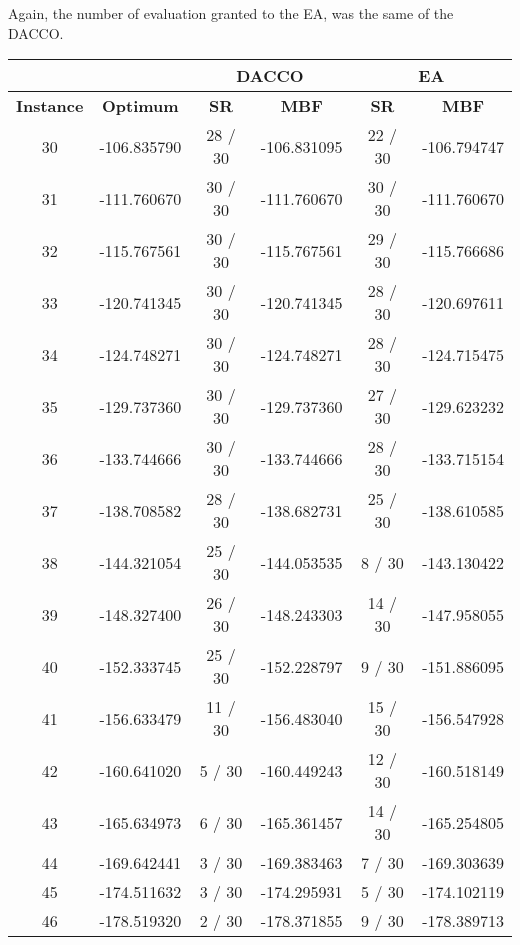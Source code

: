			Again, the number of evaluation granted to the EA, was the same of the DACCO. 

		\begin{table}[!htdp]
				\begin{center}
					\begin{tabular}{| c | c | c | c | c | c |}
						\hline
						\multicolumn{2}{|c|}{} & \multicolumn{2}{c|}{\textbf{DACCO}} & \multicolumn{2}{c|}{\textbf{EA}}\\ \hline
						\textbf{Instance} & \textbf{Optimum} & \textbf{SR} & \textbf{MBF} & \textbf{SR} & \textbf{MBF} \\ \hline
						30 & -106.835790 & 28 / 30 & -106.831095 & 22 / 30 & -106.794747 \\ \hline
						31 & -111.760670 & 30 / 30 & -111.760670 & 30 / 30 & -111.760670 \\ \hline
						32 & -115.767561 & 30 / 30 & -115.767561 & 29 / 30 & -115.766686 \\ \hline
						33 & -120.741345 & 30 / 30 & -120.741345 & 28 / 30 & -120.697611 \\ \hline
						34 & -124.748271 & 30 / 30 & -124.748271 & 28 / 30 & -124.715475 \\ \hline
						35 & -129.737360 & 30 / 30 & -129.737360 & 27 / 30 & -129.623232 \\ \hline
						36 & -133.744666 & 30 / 30 & -133.744666 & 28 / 30 & -133.715154 \\ \hline
						37 & -138.708582 & 28 / 30 & -138.682731 & 25 / 30 & -138.610585 \\ \hline
						38 & -144.321054 & 25 / 30 & -144.053535 & 8 / 30 & -143.130422 \\ \hline
						39 & -148.327400 & 26 / 30 & -148.243303 & 14 / 30 & -147.958055 \\ \hline
						40 & -152.333745 & 25 / 30 & -152.228797 & 9 / 30 & -151.886095 \\ \hline
						41 & -156.633479 & 11 / 30 & -156.483040 & 15 / 30 & -156.547928 \\ \hline
						42 & -160.641020 & 5 / 30 & -160.449243 & 12 / 30 & -160.518149 \\ \hline
						43 & -165.634973 & 6 / 30 & -165.361457 & 14 / 30 & -165.254805 \\ \hline
						44 & -169.642441 & 3 / 30 & -169.383463 & 7 / 30 & -169.303639 \\ \hline
						45 & -174.511632 & 3 / 30 & -174.295931 & 5 / 30 & -174.102119 \\ \hline
						46 & -178.519320 & 2 / 30 & -178.371855 & 9 / 30 & -178.389713 \\ \hline

\end{tabular}
\end{center}
\end{table}
